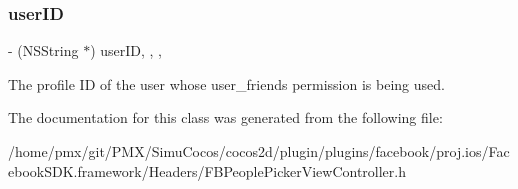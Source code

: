 \subsubsection{\texorpdfstring{user\+ID}{userID}}
{\footnotesize\ttfamily -\/ (N\+S\+String $\ast$) user\+ID\hspace{0.3cm}{\ttfamily [read]}, {\ttfamily [write]}, {\ttfamily [nonatomic]}, {\ttfamily [copy]}}

The profile ID of the user whose \textquotesingle{}user\+\_\+friends\textquotesingle{} permission is being used. 

The documentation for this class was generated from the following file\+:\begin{DoxyCompactItemize}
\item 
/home/pmx/git/\+P\+M\+X/\+Simu\+Cocos/cocos2d/plugin/plugins/facebook/proj.\+ios/\+Facebook\+S\+D\+K.\+framework/\+Headers/F\+B\+People\+Picker\+View\+Controller.\+h\end{DoxyCompactItemize}
